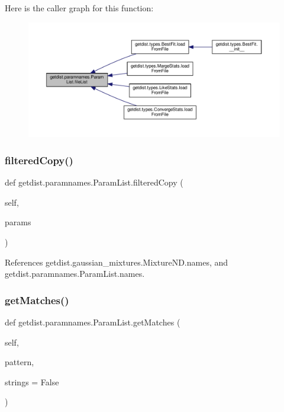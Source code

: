 Here is the caller graph for this function\+:
\nopagebreak
\begin{figure}[H]
\begin{center}
\leavevmode
\includegraphics[width=350pt]{classgetdist_1_1paramnames_1_1ParamList_a96e124851867f3679768756bb4dbd4c3_icgraph}
\end{center}
\end{figure}
\mbox{\label{classgetdist_1_1paramnames_1_1ParamList_a8722a4df4ec0e3ec0de8a47752562a0a}} 
\subsubsection{\texorpdfstring{filtered\+Copy()}{filteredCopy()}}
{\footnotesize\ttfamily def getdist.\+paramnames.\+Param\+List.\+filtered\+Copy (\begin{DoxyParamCaption}\item[{}]{self,  }\item[{}]{params }\end{DoxyParamCaption})}



References getdist.\+gaussian\+\_\+mixtures.\+Mixture\+N\+D.\+names, and getdist.\+paramnames.\+Param\+List.\+names.

\mbox{\label{classgetdist_1_1paramnames_1_1ParamList_acd3847e84096601009f5ccb145392457}} 
\subsubsection{\texorpdfstring{get\+Matches()}{getMatches()}}
{\footnotesize\ttfamily def getdist.\+paramnames.\+Param\+List.\+get\+Matches (\begin{DoxyParamCaption}\item[{}]{self,  }\item[{}]{pattern,  }\item[{}]{strings = {\ttfamily False} }\end{DoxyParamCaption})}



